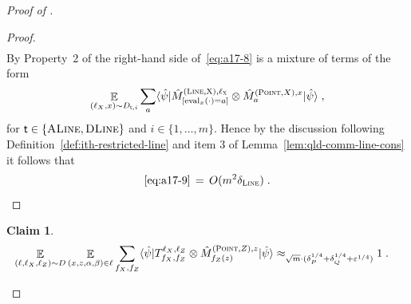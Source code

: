 \documentclass[11pt]{article}
\newtheorem{claim}[theorem]{Claim}
\theoremstyle{definition}
\newcommand{\ket}[1]{|#1\rangle}
\newcommand{\bra}[1]{\langle#1|}
\newcommand{\ot}{\otimes}
\newcommand{\eps}{\varepsilon}
\newcommand{\E}{\mathop{\mathbb{E}}\displaylimits}
\newcommand{\labelstyle}[1]{\ensuremath{\textsc{#1}}\xspace}
\newcommand{\xpt}{\labelstyle{X}}
\newcommand{\tvarstyle}[1]{\mathsf{#1}}
\newcommand{\tvar}{\ensuremath{\tvarstyle{t}}}
\newcommand{\typestyle}[1]{\ensuremath{\textsc{#1}}\xspace}
\renewcommand{\line}{\mathbf{\ell}}
\newcommand{\Point}{\typestyle{Point}}
\newcommand{\Line}{\typestyle{Line}}
\newcommand{\ALine}{\typestyle{ALine}}
\newcommand{\DLine}{\typestyle{DLine}}
\newcommand{\eval}{\mathrm{eval}}
\begin{document}
\begin{proof}[Proof of ]
\begin{proof}
\begin{align}
\end{align}
By Property~2 of  the right-hand side of~\eqref{eq:a17-8}
 is a mixture of terms of the form
\begin{equation}\label{eq:a17-9}
 \E_{(\line_X, x) \sim D_{\tvar, i}}  \sum_{a} \bra{\hat{\psi}}  \hat{M}^{(\Line,\xpt),\line_\xpt}_{[\eval_x(\cdot)=a]} \ot \hat{M}^{(\Point,X),x}_{a} \ket{\hat{\psi}}\;, 
\end{equation}
for $\tvar \in \{\ALine, \DLine\}$ and $i \in \{1, \dots, m\}$. 
Hence by the discussion following Definition~\ref{def:ith-restricted-line} and  item 3 of Lemma~\ref{lem:qld-comm-line-cons} it follows that
\[ \eqref{eq:a17-9} \,=\, O(m^2 \delta_\Line)\;. \]
\end{proof}

\begin{claim}\label{claim:17-3}
\begin{align}
  \E_{(\line, \line_X, \line_Z) \sim D}\E_{(x,z,\alpha, \beta) \in \line}\sum_{f_X,f_Z} \bra{\hat{\psi}} T^{\line_X, \line_Z}_{f_X, f_Z} \ot  \hat{M}^{(\Point,Z),z}_{f_Z(z)} \ket{\hat{\psi}} 
       &\approx_{\sqrt{m}\cdot(\delta_P^{1/4}+\delta_Q^{1/4}+\eps^{1/4})}1 \;. 
\end{align}
\end{claim}


\end{proof}
\end{document}
